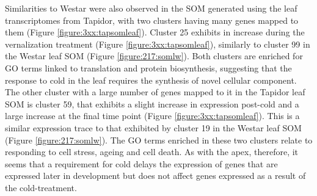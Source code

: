 \documentclass[12pt,]{book}
\begin{document}
Similarities to Westar were also observed in the SOM generated using the
leaf transcriptomes from Tapidor, with two clusters having many genes
mapped to them (Figure \ref{figure:3xx:tapsomleaf}). Cluster 25 exhibits
in increase during the vernalization treatment (Figure
\ref{figure:3xx:tapsomleaf}), similarly to cluster 99 in the Westar leaf
SOM (Figure \ref{figure:217:somlw}). Both clusters are enriched for GO
terms linked to translation and protein biosynthesis, suggesting that
the response to cold in the leaf requires the synthesis of novel
cellular component. The other cluster with a large number of genes
mapped to it in the Tapidor leaf SOM is cluster 59, that exhibits a
slight increase in expression post-cold and a large increase at the
final time point (Figure \ref{figure:3xx:tapsomleaf}). This is a similar
expression trace to that exhibited by cluster 19 in the Westar leaf SOM
(Figure \ref{figure:217:somlw}). The GO terms enriched in these two
clusters relate to responding to cell stress, ageing and cell death. As
with the apex, therefore, it seems that a requirement for cold delays
the expression of genes that are expressed later in development but does
not affect genes expressed as a result of the cold-treatment.
\end{document}
